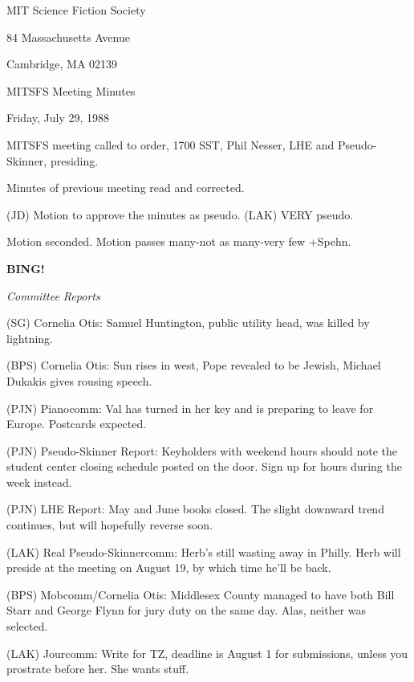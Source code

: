 \documentclass[12pt]{article}
\newcommand{\bing}{{\bf BING!} }
\newcommand{\goto}[1]{\bing \vskip 12pt \centerline{{\em{#1}}}}
\begin{document}
\begin{center}

MIT Science Fiction Society 

84 Massachusetts Avenue

Cambridge, MA 02139

\vspace{12pt}

MITSFS Meeting Minutes 

Friday, July 29, 1988

\end{center}
 
\vspace{18pt}

\setlength{\parskip}{6pt}

\noindent
MITSFS meeting called to order, 1700 SST,
Phil Nesser, LHE and Pseudo-Skinner, presiding.

Minutes of previous meeting read and corrected.

(JD) Motion to approve the minutes as pseudo. (LAK) VERY pseudo.

Motion seconded. Motion passes many-not as many-very few +Spehn.

\goto{Committee Reports}

(SG) Cornelia Otis: Samuel Huntington, public utility head, was killed by lightning.

(BPS) Cornelia Otis: Sun rises in west, Pope revealed to be Jewish, Michael Dukakis gives rousing speech.

(PJN) Pianocomm: Val has turned in her key and is preparing to leave for Europe. Postcards expected.

(PJN) Pseudo-Skinner Report: Keyholders with weekend hours should note the student center closing schedule posted on the door. Sign up for hours during the week instead.

(PJN) LHE Report: May and June books closed. The slight downward trend continues, but will hopefully reverse soon.

(LAK) Real Pseudo-Skinnercomm: Herb's still wasting away in Philly. Herb will preside at the meeting on August 19, by which time he'll be back.

(BPS) Mobcomm/Cornelia Otis: Middlesex County managed to have both Bill Starr and George Flynn for jury duty on the same day. Alas, neither was selected.

(LAK) Jourcomm: Write for TZ, deadline is August 1 for submissions, unless you prostrate before her. She wants stuff.
\end{document}
